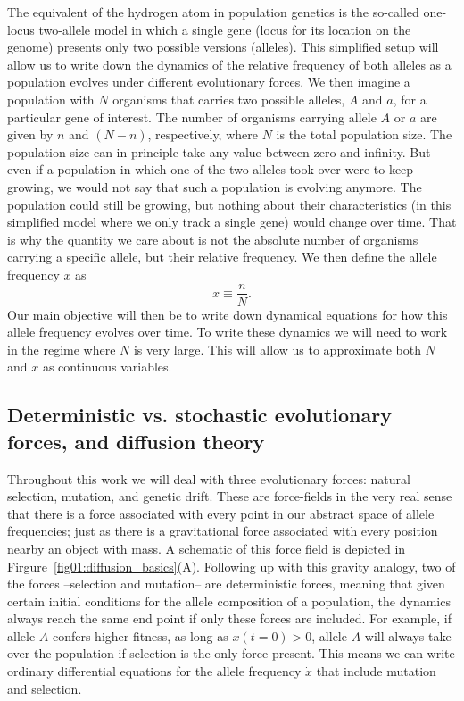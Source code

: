 The equivalent of the hydrogen atom in population genetics is the so-called
one-locus two-allele model in which a single gene (locus for its location on the
genome) presents only two possible versions (alleles). This simplified setup
will allow us to write down the dynamics of the relative frequency of both
alleles as a population evolves under different evolutionary forces. We then
imagine a population with $N$ organisms that carries two possible alleles, $A$
and $a$, for a particular gene of interest. The number of organisms carrying
allele $A$ or $a$ are given by $n$ and $(N - n)$, respectively, where $N$ is the
total population size. The population size can in principle take any value
between zero and infinity. But even if a population in which one of the two
alleles took over were to keep growing, we would not say that such a population
is evolving anymore. The population could still be growing, but nothing about
their characteristics (in this simplified model where we only track a single
gene) would change over time. That is why the quantity we care about is not the
absolute number of organisms carrying a specific allele, but their relative
frequency. We then define the allele frequency $x$ as
\begin{equation}
    x \equiv \frac{n}{N}.
\end{equation}
Our main objective will then be to write down dynamical equations for how this
allele frequency evolves over time. To write these dynamics we will need to work
in the regime where $N$ is very large. This will allow us to approximate both
$N$ and $x$ as continuous variables.

\subsection{Deterministic vs. stochastic evolutionary forces, and diffusion 
theory}

Throughout this work we will deal with three evolutionary forces: natural
selection, mutation, and genetic drift. These are force-fields in the very real
sense that there is a force associated with every point in our abstract space of
allele frequencies; just as there is a gravitational force associated with every
position nearby an object with mass. A schematic of this force field is depicted
in Firgure~\ref{fig01:diffusion_basics}(A). Following up with this gravity
analogy, two of the forces --selection and mutation-- are deterministic forces,
meaning that given certain initial conditions for the allele composition of a
population, the dynamics always reach the same end point if only these forces
are included. For example, if allele $A$ confers higher fitness, as long as $x(t
= 0) > 0$, allele $A$ will always take over the population if selection is the
only force present. This means we can write ordinary differential equations for
the allele frequency $\dot{x}$ that include mutation and selection.

